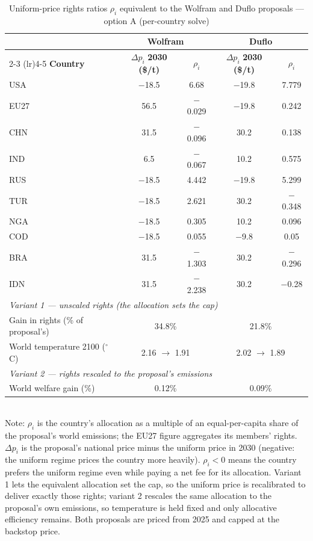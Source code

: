 \begin{table}[htbp]
\centering
\small
\caption{Uniform-price rights ratios $\rho_i$ equivalent to the Wolfram and Duflo proposals --- option A (per-country solve)}
\renewcommand{\arraystretch}{1.15}
\begin{tabular}{lcccc}
  \toprule
  & \multicolumn{2}{c}{\textbf{Wolfram}} & \multicolumn{2}{c}{\textbf{Duflo}} \\
  \cmidrule(lr){2-3} \cmidrule(lr){4-5}
  \textbf{Country} & $\Delta p_i$ \textbf{2030 (\$/t)} & $\rho_i$ & $\Delta p_i$ \textbf{2030 (\$/t)} & $\rho_i$ \\
  \midrule
  USA & $-$18.5 & 6.68 & $-$19.8 & 7.779 \\
  EU27 & 56.5 & $-$0.029 & $-$19.8 & 0.242 \\
  CHN & 31.5 & $-$0.096 & 30.2 & 0.138 \\
  IND & 6.5 & $-$0.067 & 10.2 & 0.575 \\
  RUS & $-$18.5 & 4.442 & $-$19.8 & 5.299 \\
  TUR & $-$18.5 & 2.621 & 30.2 & $-$0.348 \\
  NGA & $-$18.5 & 0.305 & 10.2 & 0.096 \\
  COD & $-$18.5 & 0.055 & $-$9.8 & 0.05 \\
  BRA & 31.5 & $-$1.303 & 30.2 & $-$0.296 \\
  IDN & 31.5 & $-$2.238 & 30.2 & $-$0.28 \\
  \midrule
  \multicolumn{5}{l}{\textit{Variant 1 --- unscaled rights (the allocation sets the cap)}} \\
  \quad Gain in rights (\% of proposal's) & \multicolumn{2}{c}{34.8\%} & \multicolumn{2}{c}{21.8\%} \\
  \quad World temperature 2100 ($^\circ$C) & \multicolumn{2}{c}{2.16 $\to$ 1.91} & \multicolumn{2}{c}{2.02 $\to$ 1.89} \\
  \midrule
  \multicolumn{5}{l}{\textit{Variant 2 --- rights rescaled to the proposal's emissions}} \\
  \quad World welfare gain (\%) & \multicolumn{2}{c}{0.12\%} & \multicolumn{2}{c}{0.09\%} \\
  \bottomrule
\end{tabular}
\label{tab:equivalent_rights_option_a_(per-country_solve)}
\\[4pt]
{\footnotesize Note: $\rho_i$ is the country's allocation as a multiple of an equal-per-capita share of the proposal's world emissions; the EU27 figure aggregates its members' rights. $\Delta p_i$ is the proposal's national price minus the uniform price in 2030 (negative: the uniform regime prices the country more heavily). $\rho_i < 0$ means the country prefers the uniform regime even while paying a net fee for its allocation. Variant 1 lets the equivalent allocation set the cap, so the uniform price is recalibrated to deliver exactly those rights; variant 2 rescales the same allocation to the proposal's own emissions, so temperature is held fixed and only allocative efficiency remains. Both proposals are priced from 2025 and capped at the backstop price.}
\end{table}

